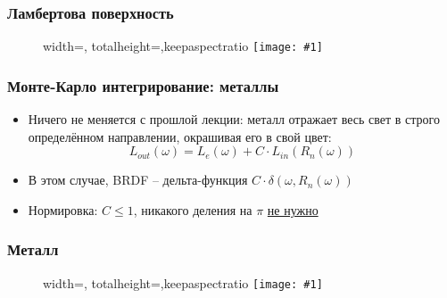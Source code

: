 \documentclass[10pt]{beamer}
\newcommand{\slideimage}[1]{
  \begin{figure}
    \begin{adjustbox}{width=\textwidth, totalheight=\textheight-2\baselineskip-2\baselineskip,keepaspectratio}
      \texttt{[image: \#1]}
    \end{adjustbox}
  \end{figure}
}
\begin{document}
\begin{frame}[fragile]
\frametitle{Ламбертова поверхность}
\slideimage{cool.png}
\end{frame}

\begin{frame}[fragile]
\frametitle{Монте-Карло интегрирование: металлы}
\begin{itemize}
\item Ничего не меняется с прошлой лекции: металл отражает весь свет в строго определённом направлении, окрашивая его в свой цвет:
\begin{equation*}
L_{out}(\omega) = L_e(\omega) + C \cdot L_{in}(R_n(\omega))
\end{equation*}
\pause
\item В этом случае, BRDF -- дельта-функция \begin{math}C \cdot \delta(\omega, R_n(\omega))\end{math}
\pause
\item Нормировка: \begin{math}C\leq 1\end{math}, никакого деления на \begin{math}\pi\end{math} \underline{не нужно}
\end{itemize}
\end{frame}

\begin{frame}[fragile]
\frametitle{Металл}
\slideimage{cool3.png}
\end{frame}
\end{document}
